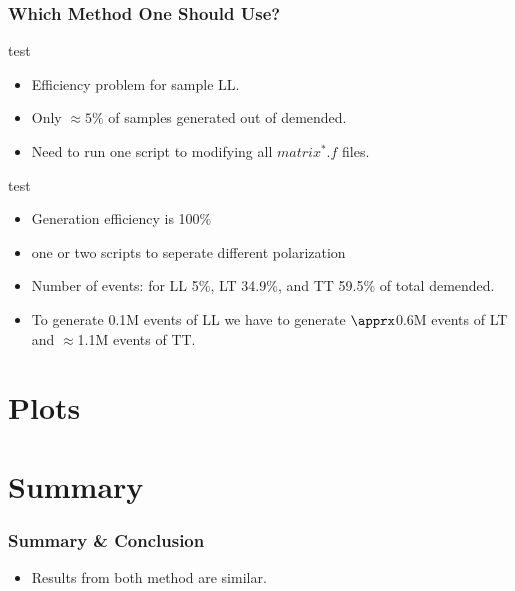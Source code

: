 \documentclass[slidestop,compress,mathserif]{beamer}
\begin{document}
\begin{frame}\frametitle{Which Method One Should Use?}
  \begin{description} test
    \item [Method-I] 
      \begin{itemize}
	\item Efficiency problem for sample LL.
	\item Only $\approx5\%$ of samples generated out of demended.
	\item Need to run one script to modifying all $matrix^*.f$ files.
      \end{itemize}
    \item [Method-II] test
      \begin{itemize}
	\item Generation efficiency is 100\%
	\item one or two scripts to seperate different polarization
	\item Number of events: for LL 5\%, LT 34.9\%, and TT 59.5\% of total demended.
	\item To generate 0.1M events of LL we have to generate $\apprx$0.6M events of LT and $\approx$1.1M events of TT.
      \end{itemize}
  \end{description}
\end{frame}

\section{Plots}

\section{Summary}
\label{lastslide}
\begin{frame}\frametitle{Summary \& Conclusion}
  \begin{itemize}
    \item Results from both method are similar.
  \end{itemize}
\end{frame}



\end{document}
